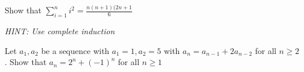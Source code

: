 \documentclass{report}
\begin{document}
     {
      Show that $\sum^{n}_{i=1} i^2 = \frac{n(n+1)(2n+1}{6} $
    }
     {
      \emph{HINT:  Use complete induction}

      Let $a_1, a_2$ be a sequence with $a_1=1, a_2=5$ with
      $a_n = a_{n-1}+2a_{n-2}$ for all $n \geq2$.  Show that
      $a_n = 2^n+(-1)^n$ for all $n \geq 1$
    }
\end{document}
